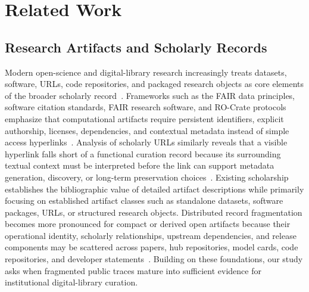 \section{Related Work}
\label{sec:related}

\subsection{Research Artifacts and Scholarly Records}
Modern open-science and digital-library research increasingly treats datasets, software, URLs, code repositories, and packaged research objects as core elements of the broader scholarly record~\cite{wilkinson2016fair,datacitation2014joint,smith2016softwarecitation,lamprecht2020fairsoftware,katz2021freshfairsoftware,barker2022fair4rs,soilandreyes2022rocrate}.
Frameworks such as the FAIR data principles, software citation standards, FAIR research software, and RO-Crate protocols emphasize that computational artifacts require persistent identifiers, explicit authorship, licenses, dependencies, and contextual metadata instead of simple access hyperlinks~\cite{wilkinson2016fair,datacitation2014joint,smith2016softwarecitation,lamprecht2020fairsoftware,katz2021freshfairsoftware,barker2022fair4rs,soilandreyes2022rocrate}.
Analysis of scholarly URLs similarly reveals that a visible hyperlink falls short of a functional curation record because its surrounding textual context must be interpreted before the link can support metadata generation, discovery, or long-term preservation choices~\cite{salsabil2025context}.
Existing scholarship establishes the bibliographic value of detailed artifact descriptions while primarily focusing on established artifact classes such as standalone datasets, software packages, URLs, or structured research objects.
Distributed record fragmentation becomes more pronounced for compact or derived open \llm artifacts because their operational identity, scholarly relationships, upstream dependencies, and release components may be scattered across papers, hub repositories, model cards, code repositories, and developer statements~\cite{mitchell2019modelcards,pepe2024hfdocs,kadasi2025modelhubs,jiang2023ptmreuse,taraghi2024modelreuse}.
Building on these foundations, our study asks when fragmented public traces mature into sufficient evidence for institutional digital-library curation.

